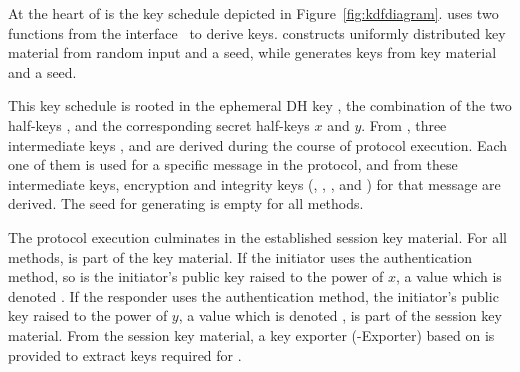 %
%
%
At the heart of \mEdhoc{} is the key schedule depicted in
Figure~\ref{fig:kdfdiagram}.
%
\mEdhoc{} uses two functions from the \mHkdf{} interface~\cite{rfc5869} to derive keys.
%
\mHkdfExtract{} 
constructs uniformly distributed key material from random input and a seed,
while \mHkdfExpand{} generates keys from key material and a seed.
%
%

This key schedule is rooted in the ephemeral DH key \mGxy{}, the combination
of the two half-keys \mGx{}, \mGy{} and the corresponding secret half-keys $x$ and $y$.
%
From \mGxy{}, three intermediate keys \mPRKtwo, \mPRKthree{} and
\mPRKfour{} are derived during the course of protocol execution.
%
Each one of them is used for a specific message in the protocol, and from
these intermediate keys, encryption and integrity keys
(\mKtwoe, \mKtwom{}, \mKthreeae, and \mKthreem) for that message are derived.
%
The seed for generating \mPRKtwo{} is empty for all methods. %
%

%

The protocol execution culminates in the established session key material.
%
%
For all methods, \mGxy{} is part of the key material.
%
If the initiator uses the \mStat{} authentication method, so is
the initiator's public key \mGr{} raised to the power of $x$, a value which is
denoted \mGrx.
%
If the responder uses the \mStat{} authentication method,
the initiator's public key \mGi{} raised to the power of $y$, a value which is
denoted \mGiy{}, is part of the session key material.
%
From the session key material, a key exporter (\mEdhoc-Exporter) based on
\mHkdf{} is provided to extract keys required for \mOscore{}.
%
%

